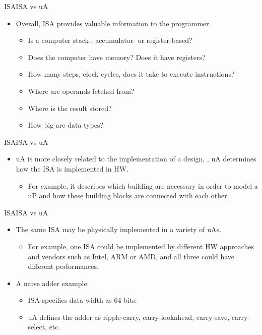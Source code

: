 \begin{frame}{\acl{ISA}}{\acs{ISA} vs \acs{uA}}
\begin{itemize}
  \item Overall, \ac{ISA} provides valuable information to the programmer.
  \begin{itemize}
  	\item Is a computer stack-, accumulator- or register-based?
  	\item Does the computer have memory? Does it have registers?
  	\item How many steps, \ie clock cycles, does it take to execute instructions?
  	\item Where are operands fetched from?
  	\item Where is the result stored?
  	\item How big are data types?
  \end{itemize}
\end{itemize}
\end{frame}


\begin{frame}{\acl{ISA}}{\acs{ISA} vs \acs{uA}}
\begin{itemize}
  \item \ac{uA} is more closely related to the  implementation of a design, \ie, \ac{uA} determines how the \ac{ISA} is implemented in \ac{HW}.
  \begin{itemize}
    \item For example, it describes which building are necessary in order to model a \ac{uP} and how these building blocks are connected with each other. 
  \end{itemize}
\end{itemize}
\end{frame}

\begin{frame}{\acl{ISA}}{\acs{ISA} vs \acs{uA}}
\begin{itemize}
  \item The same \ac{ISA} may be physically implemented in a variety of \acp{uA}.
  \begin{itemize}
  	\item For example, one \ac{ISA} could be implemented by different \ac{HW} approaches and vendors such as Intel, ARM or AMD, and all three could have different performances.  
  \end{itemize}
  \item A naive adder example: 
  	\begin{itemize}
  	\item \ac{ISA} specifies data width as 64-bits. 
  	\item \ac{uA} defines the adder as ripple-carry, carry-lookahead, carry-save, carry-select, etc.
  	\end{itemize}
\end{itemize}
\end{frame}


